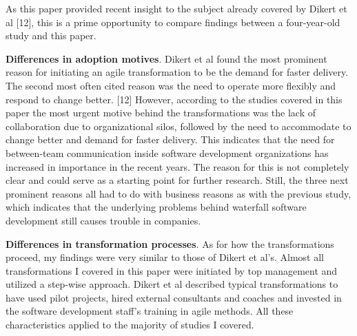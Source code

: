 As this paper provided recent insight to the subject already covered by
Dikert et al [12], this is a prime opportunity to compare findings between a
four-year-old study and this paper.


{\bfseries Differences in adoption motives}. Dikert et al found the
most prominent reason for initiating an agile transformation to be the
demand for faster delivery. The second most often cited reason was
the need to operate more flexibly and respond to change better. [12]
However, according to the studies covered in this paper the most urgent
motive behind the transformations was the lack of collaboration due
to organizational silos, followed by the need to accommodate to change
better and demand for faster delivery. This indicates that the need for
between-team communication inside software development organizations
has increased in importance in the recent years. The reason for this is
not completely clear and could serve as a starting point for further
research. Still, the three next prominent reasons all had to do with
business reasons as with the previous study, which indicates that the
underlying problems behind waterfall software development still causes
trouble in companies.


{\bfseries Differences in transformation processes}. As for how the
transformations proceed, my findings were very similar to those of
Dikert et al's. Almost all transformations I covered in this paper were
initiated by top management and utilized a step-wise approach. Dikert
et al described typical transformations to have used pilot projects,
hired external consultants and coaches and invested in the software
development staff's training in agile methods. All these characteristics
applied to the majority of studies I covered.
